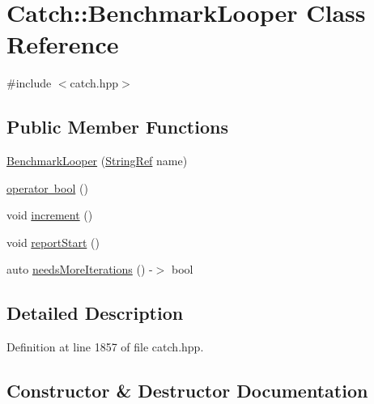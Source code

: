 \hypertarget{class_catch_1_1_benchmark_looper}{}\section{Catch\+:\+:Benchmark\+Looper Class Reference}
\label{class_catch_1_1_benchmark_looper}


{\ttfamily \#include $<$catch.\+hpp$>$}

\subsection*{Public Member Functions}
\begin{DoxyCompactItemize}
\item 
\mbox{\hyperlink{class_catch_1_1_benchmark_looper_ab9ba6397306a70082f39e63a8a71bde6}{Benchmark\+Looper}} (\mbox{\hyperlink{class_catch_1_1_string_ref}{String\+Ref}} name)
\item 
\mbox{\hyperlink{class_catch_1_1_benchmark_looper_a54da41bada9da038dc05faf41d746765}{operator bool}} ()
\item 
void \mbox{\hyperlink{class_catch_1_1_benchmark_looper_a210552aff5b19408637444d4bb35d59c}{increment}} ()
\item 
void \mbox{\hyperlink{class_catch_1_1_benchmark_looper_a0697d1b266112b110edf2025b82c4e77}{report\+Start}} ()
\item 
auto \mbox{\hyperlink{class_catch_1_1_benchmark_looper_a97bd944521f519b1593a5d1d2f9998fa}{needs\+More\+Iterations}} () -\/$>$ bool
\end{DoxyCompactItemize}


\subsection{Detailed Description}


Definition at line 1857 of file catch.\+hpp.



\subsection{Constructor \& Destructor Documentation}
\mbox{\label{class_catch_1_1_benchmark_looper_ab9ba6397306a70082f39e63a8a71bde6}} 
